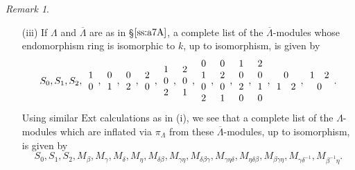 \documentclass{amsart}
\theoremstyle{plain}
\theoremstyle{definition}
\theoremstyle{remark}
\newtheorem{rem}[thm]{Remark}
\begin{document}
\begin{rem}
\begin{enumerate}
\item[(iii)] 
If $\Lambda$ and $\overline{\Lambda}$ are as in \S$\ref{ss:a7A}$, a complete list of the 
$\overline{\Lambda}$-modules whose endomorphism ring is isomorphic to $k$, up to isomorphism, is 
given by
$$S_0,S_1, S_2,  \begin{array}{c}1\\0\end{array}, \begin{array}{c}0\\1\end{array},
\begin{array}{c}0\\2\end{array},\begin{array}{c}2\\0\end{array},
\begin{array}{c}1\\0\\2\end{array},\begin{array}{c}2\\0\\1\end{array},
\begin{array}{c}0\\1\\0\\2\end{array}, \begin{array}{c}0\\2\\0\\1\end{array},
\begin{array}{c}1\\0\\2\\0\end{array},\begin{array}{c}2\\0\\1\\0\end{array},
\begin{array}{cc}\multicolumn{2}{c}{0}\\1&2\end{array}, 
\begin{array}{cc}1&2\\\multicolumn{2}{c}{0}\end{array}.$$
Using similar $\mathrm{Ext}$ calculations as in (i), we see that
a complete list of the $\Lambda$-modules which are inflated via $\pi_\Lambda$
from these $\overline{\Lambda}$-modules, up to isomorphism, is given by
$$S_0,S_1, S_2, M_\beta, M_\gamma, M_\delta, M_\eta, M_{\delta\beta},
M_{\gamma\eta}, M_{\delta\beta\gamma}, M_{\gamma\eta\delta},M_{\eta\delta\beta},
M_{\beta\gamma\eta}, M_{\gamma\delta^{-1}},M_{\beta^{-1}\eta}.$$
\end{enumerate}
\end{rem}
\end{document}
